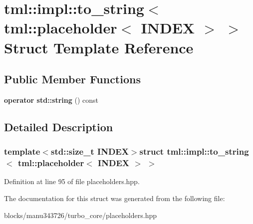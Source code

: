 \hypertarget{structtml_1_1impl_1_1to__string_3_01tml_1_1placeholder_3_01_i_n_d_e_x_01_4_01_4}{\section{tml\+:\+:impl\+:\+:to\+\_\+string$<$ tml\+:\+:placeholder$<$ I\+N\+D\+E\+X $>$ $>$ Struct Template Reference}
\label{structtml_1_1impl_1_1to__string_3_01tml_1_1placeholder_3_01_i_n_d_e_x_01_4_01_4}
}
\subsection*{Public Member Functions}
\begin{DoxyCompactItemize}
\item 
\hypertarget{structtml_1_1impl_1_1to__string_3_01tml_1_1placeholder_3_01_i_n_d_e_x_01_4_01_4_aa2910105bc1d91762c93fc60c6012144}{{\bfseries operator std\+::string} () const }\label{structtml_1_1impl_1_1to__string_3_01tml_1_1placeholder_3_01_i_n_d_e_x_01_4_01_4_aa2910105bc1d91762c93fc60c6012144}

\end{DoxyCompactItemize}


\subsection{Detailed Description}
\subsubsection*{template$<$std\+::size\+\_\+t I\+N\+D\+E\+X$>$struct tml\+::impl\+::to\+\_\+string$<$ tml\+::placeholder$<$ I\+N\+D\+E\+X $>$ $>$}



Definition at line 95 of file placeholders.\+hpp.



The documentation for this struct was generated from the following file\+:\begin{DoxyCompactItemize}
\item 
blocks/manu343726/turbo\+\_\+core/placeholders.\+hpp\end{DoxyCompactItemize}
